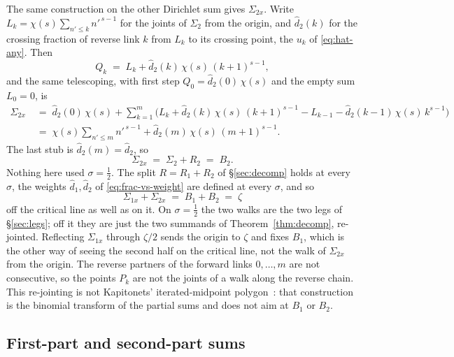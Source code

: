 \documentclass[11pt]{article}
\theoremstyle{definition}
\begin{document}
The same construction on the other Dirichlet sum gives \(\Sigma_{2x}\). Write
\(L_k=\chi(s)\sum_{n'\le k}n'^{\,s-1}\) for the joints of \(\Sigma_2\) from
the origin, and \(\hat d_2(k)\) for the crossing fraction of reverse
link \(k\) from \(L_k\) to its crossing point, the \(u_k\) of
\eqref{eq:hat-any}. Then
\begin{equation}\label{eq:sum-2x-point}
Q_k
\;=\;
L_k+\hat d_2(k)\,\chi(s)\,(k+1)^{s-1},
\end{equation}
and the same telescoping, with first step \(Q_0=\hat d_2(0)\,\chi(s)\) and the
empty sum \(L_0=0\), is
\begin{equation}\label{eq:sum-2x}
\begin{aligned}
\Sigma_{2x}
&\;=\;
\hat d_2(0)\,\chi(s)+\sum_{k=1}^{m}\Biggl(
L_k+\hat d_2(k)\,\chi(s)\,(k+1)^{s-1}
-L_{k-1}-\hat d_2(k-1)\,\chi(s)\,k^{s-1}
\Biggr)\\
&\;=\;
\chi(s)\sum_{n'\le m}n'^{\,s-1}+\hat d_2(m)\,\chi(s)\,(m+1)^{s-1}.
\end{aligned}
\end{equation}
The last stub is \(\hat d_2(m)=\hat d_2\), so
\begin{equation}\label{eq:sum-2x-B2}
\Sigma_{2x}
\;=\;
\Sigma_2+R_{2}
\;=\;
B_2.
\end{equation}
Nothing here used \(\sigma=\tfrac12\). The split
\(R=R_{1}+R_{2}\) of \S\ref{sec:decomp} holds at every \(\sigma\), the
weights \(\hat d_1,\hat d_2\) of \eqref{eq:frac-vs-weight} are defined at
every \(\sigma\), and so
\begin{equation}\label{eq:sum-x-zeta}
\Sigma_{1x}+\Sigma_{2x}
\;=\;
B_1+B_2
\;=\;
\zeta
\end{equation}
off the critical line as well as on it. On \(\sigma=\tfrac12\) the two walks
are the two legs of \S\ref{sec:legs}; off it they are just the two summands
of Theorem~\ref{thm:decomp}, re-jointed. Reflecting \(\Sigma_{1x}\) through
\(\zeta/2\) sends the origin to \(\zeta\) and fixes \(B_1\), which is the
other way of seeing the second half on the critical line, not the walk of
\(\Sigma_{2x}\) from the origin. The reverse partners of the forward links
\(0,\dots,m\) are not consecutive, so the points \(P_k\) are not the joints
of a walk along the reverse chain. This re-jointing is not Kapitonets'
iterated-midpoint polygon~\cite{Kapitonets2019}: that construction is the
binomial transform of the partial sums and does not aim at \(B_1\) or
\(B_2\).

\subsection{First-part and second-part sums}\label{sec:half-link-sums}
\end{document}
